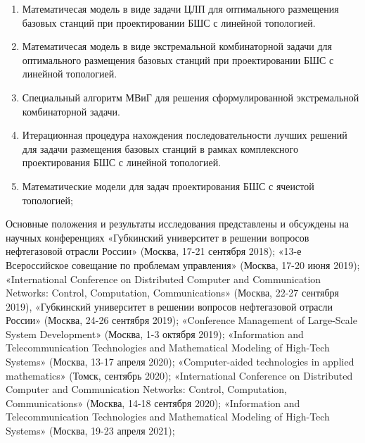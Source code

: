 \begin{enumerate}[beginpenalty=10000] %
    \item Математичесая модель в виде задачи ЦЛП для оптимального размещения базовых станций при проектировании БШС с линейной топологией.
    \item Математичесая модель в виде экстремальной комбинаторной задачи для оптимального размещения базовых станций при проектировании БШС с линейной топологией.
    \item Специальный алгоритм МВиГ для решения сформулированной
    экстремальной комбинаторной задачи.
    \item Итерационная процедура нахождения последовательности лучших
    решений для задачи размещения базовых станций в рамках комплексного
    проектирования БШС с линейной топологией.
    \item Математические модели для задач проектирования БШС с ячеистой
    топологией;
  \end{enumerate}




{\probation}
Основные положения и результаты исследования представлены и обсуждены на научных конференциях «Губкинский университет в решении вопросов нефтегазовой отрасли России» (Москва, 17-21 сентября 2018); «13-е Всероссийское совещание по проблемам управления» (Москва, 17-20 июня 2019); «International Conference on Distributed Computer and Communication Networks: Control, Computation, Communications» (Москва, 22-27 сентября 2019), «Губкинский университет в решении вопросов нефтегазовой отрасли России» (Москва, 24-26 сентября 2019); «Conference Management of Large-Scale System Development» (Москва, 1-3 октября 2019); «Information and Telecommunication Technologies and Mathematical Modeling of High-Tech Systems» (Москва, 13-17 апреля 2020); «Computer-aided technologies in applied mathematics» (Томск, сентябрь 2020); «International Conference on Distributed Computer and Communication Networks: Control, Computation, Communications» (Москва, 14-18 сентября 2020); «Information and Telecommunication Technologies and Mathematical Modeling of High-Tech Systems» (Москва, 19-23 апреля 2021);


